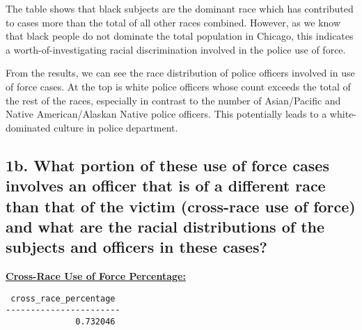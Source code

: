 \documentclass[10pt]{article}
\begin{document}
The table shows that black subjects are the dominant race which has contributed to cases more than the total of all other races combined. However, as we know that black people do not dominate the total population in Chicago, this indicates a worth-of-investigating racial discrimination involved in the police use of force.

From the results, we can see the race distribution of police officers involved in use of force cases. At the top is white police officers whose count exceeds the total of the rest of the races, especially in contrast to the number of Asian/Pacific and Native American/Alaskan Native police officers. This potentially leads to a white-dominated culture in police department.


\subsection*{1b. What portion of these use of force cases involves an officer that is of a different race than that of the victim (cross-race use of force) and what are the racial distributions of the subjects and officers in these cases?}

\underline{\textbf{Cross-Race Use of Force Percentage:}}
\begin{verbatim}
 cross_race_percentage
-----------------------
              0.732046
\end{verbatim}
\end{document}
